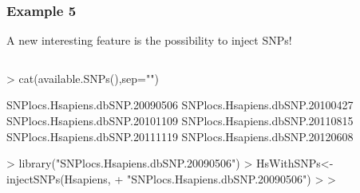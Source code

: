\documentclass{beamer}
\begin{document}

\begin{frame}[fragile]
\frametitle{Example 5}
  \bit
      \item A new interesting feature is the possibility to inject SNPs!
  \eit
        \begin{column}[t]{0.45\textwidth}%
        \begin{uncoverenv}
\begin{Schunk}
\begin{Sinput}
> cat(available.SNPs(),sep="\n")
\end{Sinput}
\begin{Soutput}
SNPlocs.Hsapiens.dbSNP.20090506
SNPlocs.Hsapiens.dbSNP.20100427
SNPlocs.Hsapiens.dbSNP.20101109
SNPlocs.Hsapiens.dbSNP.20110815
SNPlocs.Hsapiens.dbSNP.20111119
SNPlocs.Hsapiens.dbSNP.20120608
\end{Soutput}
\begin{Sinput}
> library("SNPlocs.Hsapiens.dbSNP.20090506")
> HsWithSNPs<-injectSNPs(Hsapiens,
+           "SNPlocs.Hsapiens.dbSNP.20090506")
> 
> 
\end{Sinput}
\end{Schunk}
        \end{uncoverenv}   
        \end{column}
\end{frame}
\end{document}
